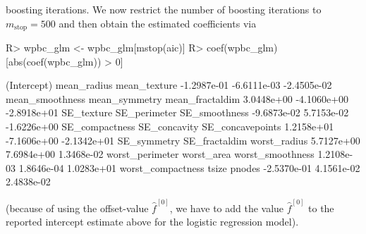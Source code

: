 \documentclass{article}
\newcommand{\Robject}[1]{\texttt{#1}}
\newenvironment{Schunk}{}{}
\begin{document}
boosting iterations. 
We now restrict the number of boosting iterations to 
$m_\text{stop} = 500$ and then obtain the estimated
coefficients via 
\begin{Schunk}
\begin{Sinput}
R> wpbc_glm <- wpbc_glm[mstop(aic)]
R> coef(wpbc_glm)[abs(coef(wpbc_glm)) > 0]
\end{Sinput}
\begin{Soutput}
      (Intercept)       mean_radius      mean_texture 
      -1.2987e-01       -6.6111e-03       -2.4505e-02 
  mean_smoothness     mean_symmetry   mean_fractaldim 
       3.0448e+00       -4.1060e+00       -2.8918e+01 
       SE_texture      SE_perimeter     SE_smoothness 
      -9.6873e-02        5.7153e-02       -1.6226e+00 
   SE_compactness      SE_concavity  SE_concavepoints 
       1.2158e+01       -7.1606e+00       -2.1342e+01 
      SE_symmetry     SE_fractaldim      worst_radius 
       5.7127e+00        7.6984e+00        1.3468e-02 
  worst_perimeter        worst_area  worst_smoothness 
       1.2108e-03        1.8646e-04        1.0283e+01 
worst_compactness             tsize            pnodes 
      -2.5370e-01        4.1561e-02        2.4838e-02 
\end{Soutput}
\end{Schunk}
(because of using the offset-value $\hat{f}^{[0]}$, we have to add the value
$\hat{f}^{[0]}$ to the reported intercept estimate above for the logistic
regression model). 
\end{document}
